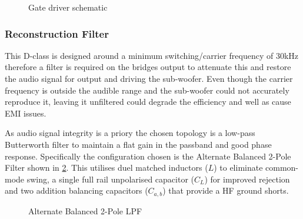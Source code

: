 \documentclass[11pt]{article}
\begin{document}
{\begin{figure}[h!]
  \centering
  \caption{Gate driver schematic}
  \label{F:gate_drive_schem}
\end{figure}


\subsubsection*{Reconstruction Filter}

This D-class is designed around a minimum switching/carrier frequency of 30kHz therefore a filter is required on the bridges output to attenuate this and restore the audio signal for output and driving the sub-woofer. Even though the carrier frequency is outside the audible range and the sub-woofer could not accurately reproduce it, leaving it unfiltered could degrade the efficiency and well as cause EMI issues.

As audio signal integrity is a priory the chosen topology is a low-pass Butterworth filter to maintain a flat gain in the passband and good phase response.
Specifically the configuration chosen is the Alternate Balanced 2-Pole Filter shown in \cref{F:opf_schem}. This utilises duel matched inductors ($L$) to eliminate common-mode swing, a single full rail unpolarised capacitor ($C_L$) for improved rejection and two addition balancing capacitors ($C_{a,b}$) that provide a HF ground shorts.

\begin{figure}[h!]
  \centering
  \caption{Alternate Balanced 2-Pole LPF}
  \label{F:opf_schem}
\end{figure}

}
\end{document}
